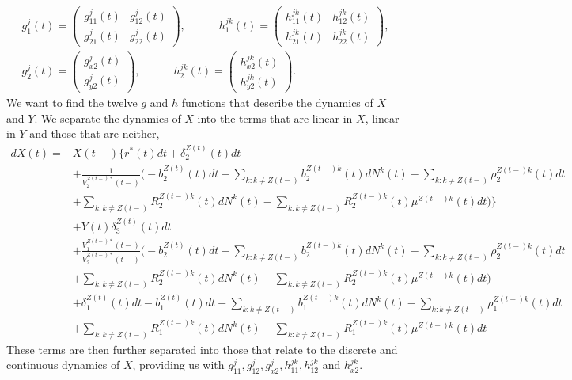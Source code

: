 \documentclass[12pt]{article}
\theoremstyle{my_thm}
\begin{document}
\begin{gather*}
g^j_1(t)=\begin{pmatrix}
g^j_{11}(t) & g^j_{12}(t) \\
g^j_{21}(t) & g^j_{22}(t)
\end{pmatrix},
\qquad 
\quad
h^{jk}_1(t)=\begin{pmatrix}
h^{jk}_{11}(t) & h^{jk}_{12}(t) \\
h^{jk}_{21}(t) & h^{jk}_{22}(t)
\end{pmatrix},
\\
g_2^j(t)=\begin{pmatrix}
g^j_{x2}(t) \\
g^j_{y2}(t)
\end{pmatrix},
\qquad 
\quad
h^{jk}_2(t)=\begin{pmatrix}
h^{jk}_{x2}(t) \\
h^{jk}_{y2}(t)
\end{pmatrix}.
\end{gather*}
We want to find the twelve $g$ and $h$ functions that describe the dynamics of $X$ and $Y$. We separate the dynamics of $X$ into the terms that are linear in $X$, linear in $Y$ and those that are neither,
\begin{align*}
dX(t)=&X(t-) \bigg\lbrace 
r^*(t)dt+\delta_2^{Z(t)}(t)dt
\\
&+
\frac{1}{V^{Z(t-)*}_2(t-)}
\bigg(
-b_2^{Z(t)}(t)dt-\sum_{k:k\neq Z(t-)}b_2^{Z(t-)k}(t)dN^k(t)
-\sum_{k:k\neq Z(t-)} \rho^{Z(t-)k}_2(t) dt
\\
&+\sum_{k:k\neq Z(t-)} R^{Z(t-)k}_2(t) dN^k(t)
-\sum_{k:k\neq Z(t-)} R^{Z(t-)k}_2(t) \mu^{Z(t-)k}(t)dt
\bigg)
\bigg\rbrace
\\
&+ Y(t)  \delta_3^{Z(t)}(t)dt
\\
&+
\frac{V^{Z(t-)*}_1(t-)}{V^{Z(t-)*}_2(t-)}
\bigg( -b_2^{Z(t)}(t)dt-\sum_{k:k\neq Z(t-)}b_2^{Z(t-)k}(t)dN^k(t)
-\sum_{k:k\neq Z(t-)} \rho^{Z(t-)k}_2(t) dt
\\
&+\sum_{k:k\neq Z(t-)} R^{Z(t-)k}_2(t) dN^k(t)
-\sum_{k:k\neq Z(t-)} R^{Z(t-)k}_2(t) \mu^{Z(t-)k}(t)dt \bigg)
\\
&+ \delta_1^{Z(t)}(t)dt 
-b_1^{Z(t)}(t)dt-\sum_{k:k\neq Z(t-)}b_1^{Z(t-)k}(t)dN^k(t)
-\sum_{k:k\neq Z(t-)} \rho^{Z(t-)k}_1(t) dt
\\
&+\sum_{k:k\neq Z(t-)} R^{Z(t-)k}_1(t) dN^k(t)
-\sum_{k:k\neq Z(t-)} R^{Z(t-)k}_1(t) \mu^{Z(t-)k}(t)dt
\end{align*}
These terms are then further separated into those that relate to the discrete and continuous dynamics of $X$, providing us with $g_{11}^j,g_{12}^j,g_{x2}^j,h_{11}^{jk},h_{12}^{jk}$ and $h_{x2}^{jk}$.
\end{document}
